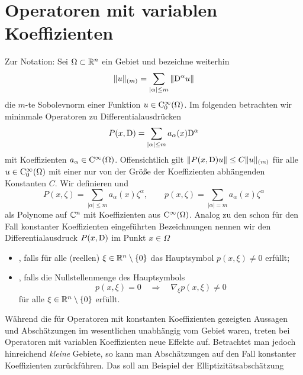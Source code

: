 \chapter{Operatoren mit variablen Koeffizienten}

Zur Notation: Sei $\Omega\subset\mathbb R^n$ ein Gebiet und bezeichne weiterhin 
\begin{equation}
    \|u\|_{(m)} = \sum_{|\alpha|\le m} \|\mathrm D^\alpha u\|
\end{equation}
die $m$-te Sobolevnorm einer Funktion $u\in\mathrm C_0^\infty(\Omega)$. Im folgenden betrachten wir mininmale Operatoren zu Differentialausdrücken
\begin{equation}
   P(x,\mathrm D) = \sum_{|\alpha|\le m} a_\alpha(x) \mathrm D^\alpha
\end{equation}
mit Koeffizienten $a_\alpha\in\mathrm C^\infty(\Omega)$. Offensichtlich gilt $\|P(x,\mathrm D)u\|\le C\|u\|_{(m)}$ für alle $u\in\mathrm C_0^\infty(\Omega)$ mit einer nur von der Größe der Koeffizienten abhängenden Konstanten $C$.
Wir definieren  und 
\begin{equation}
   P(x,\zeta) = \sum_{|\alpha|\le m} a_\alpha(x)\zeta^\alpha,\qquad p(x,\zeta)=\sum_{|\alpha|=m} a_\alpha(x)\zeta^\alpha
\end{equation}
als Polynome auf $\mathbb C^n$ mit Koeffizienten aus $\mathrm C^\infty(\Omega)$. Analog zu den schon für den Fall konstanter Koeffizienten eingeführten Bezeichnungen nennen wir den Differentialausdruck $P(x,\mathrm D)$ im Punkt $x\in\Omega$
\begin{itemize}
\item {}, falls für alle (reellen) $\xi\in\mathbb R^n\setminus\{0\}$ das Hauptsymbol $p(x,\xi)\ne0$ erfüllt;
\item {}, falls die Nullstellenmenge des Hauptsymbols 
\begin{equation}
    p(x,\xi) = 0 \quad \Longrightarrow \quad \nabla_\xi p(x,\xi)\ne0
\end{equation}
für alle $\xi\in\mathbb R^n\setminus\{0\}$ erfüllt.
\end{itemize}
Während die für Operatoren mit konstanten Koeffizienten gezeigten Aussagen und Abschätzungen im wesentlichen unabhängig vom Gebiet waren, 
treten bei Operatoren mit variablen Koeffizienten neue Effekte auf. Betrachtet man jedoch hinreichend {\em kleine} Gebiete, so kann man Abschätzungen auf den Fall konstanter Koeffizienten zurückführen. Das soll am Beispiel der Elliptizitätsabschätzung
